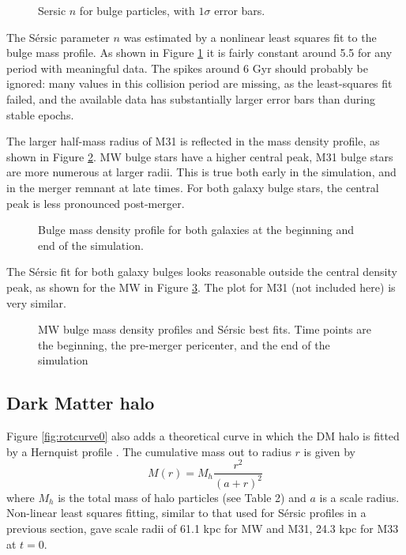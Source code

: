 \documentclass[twocolumn]{aastex63}
\begin{document}
\begin{figure}[bht!]
	\caption{Sersic $n$ for bulge particles, with $1\sigma$ error bars.
		\label{fig:sersic_n}}
\end{figure}

The Sérsic parameter $n$ was estimated by a nonlinear least squares fit to the bulge mass profile. As shown in Figure \ref{fig:sersic_n} it is fairly constant around 5.5 for any period with meaningful data. The spikes around 6 Gyr should probably be ignored: many values in this collision period are missing, as the least-squares fit failed, and the available data has substantially larger error bars than during stable epochs.

The larger half-mass radius of M31 is reflected in the mass density profile, as shown in Figure \ref{fig:bulge_mp}. MW bulge stars have a higher central peak, M31 bulge stars are more numerous at larger radii. This is true both early in the simulation, and in the merger remnant at late times. For both galaxy bulge stars, the central peak is less pronounced post-merger.

\begin{figure}[bht!]
	\caption{Bulge mass density profile for both galaxies at the beginning and end of the simulation.
		\label{fig:bulge_mp}}
\end{figure}

The Sérsic fit for both galaxy bulges looks reasonable outside the central density peak, as shown for the MW in Figure \ref{fig:MW_bulge_sersic}. The plot for M31 (not included here) is very  similar.

\begin{figure}[bht!]
	\caption{MW bulge mass density profiles and Sérsic best fits. Time points are the beginning, the pre-merger pericenter, and the end of the simulation
		\label{fig:MW_bulge_sersic}}
\end{figure}

\subsection{Dark Matter halo}

Figure \ref{fig:rotcurve0} also adds a theoretical curve in which the DM halo is fitted by a Hernquist profile \citep{hernquist_analytical_1990}. The cumulative mass out to radius $r$ is given by
\[ M(r) = M_h \frac{r^2}{(a+r)^2} \]
where $M_h$ is the total mass of halo particles (see Table 2) and $a$ is a scale radius. Non-linear least squares fitting, similar to that used for Sérsic profiles in a previous section, gave scale radii of 61.1 kpc for MW and M31, 24.3 kpc for M33 at $t=0$.
\end{document}
